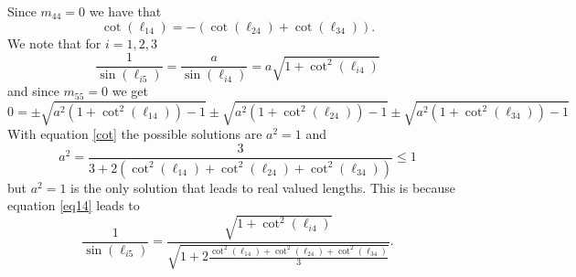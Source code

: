 \documentclass{amsart}
\theoremstyle{definition}
\theoremstyle{remark}
\numberwithin{equation}{section}
\begin{document}
Since $m_{44}=0$ we have that
\begin{equation} \label{cot}
\cot(\ell_{14})=-(\cot(\ell_{24})+\cot(\ell_{34})).
\end{equation}
We note that for $i=1,2,3$
\begin{equation} \label{eq14}
\frac{1}{\sin(\ell_{i5})}=\frac{a}{\sin(\ell_{i4})}=a\sqrt{1+\cot^2(\ell_{i4})}
\end{equation} and since $m_{55}=0$ we get
$$0=\pm\sqrt{a^2(1+\cot^2(\ell_{14}))-1}\pm\sqrt{a^2(1+\cot^2(\ell_{24}))-1}\pm\sqrt{a^2(1+\cot^2(\ell_{34}))-1}$$
With equation \eqref{cot} the possible solutions are $a^2=1$ and 
$$a^2=\frac{3}{3+2(\cot^2(\ell_{14})+\cot^2(\ell_{24})+\cot^2(\ell_{34}))}\leq 1$$
but $a^2=1$ is the only solution that leads to real valued lengths.
This is because equation \eqref{eq14} leads to
$$ 
\frac{1}{\sin(\ell_{i5})} =  \frac{ \sqrt{1+\cot^2(\ell_{i4})}}{\sqrt{1+ 2\frac{\cot^2(\ell_{14})+ \cot^2(\ell_{24}) + \cot^2(\ell_{34})}{3}}} . 
$$
\end{document}
